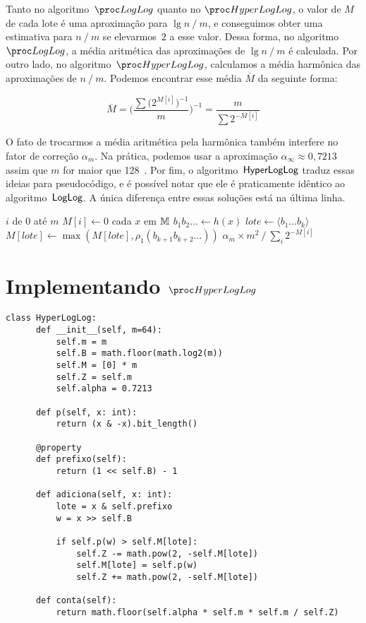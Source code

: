 Tanto no algoritmo~$\LOG$ quanto no $\HLOG$, o valor de $M$ de cada lote é uma aproximação para $\lg n \mathbin{/} m$, e 
conseguimos obter uma estimativa para $n \mathbin{/} m$ se elevarmos~$2$ a esse valor. Dessa forma, no algoritmo~$\LOG$, 
a média aritmética das aproximações de $\lg n \mathbin{/} m$ é calculada. Por outro lado, no algoritmo~$\HLOG$, 
calculamos a média harmônica das aproximações de $n \mathbin{/} m$. Podemos encontrar esse média $\overline{M}$ da 
seguinte forma:

\[ \overline{M} = \bigg(\frac{\sum\big(2^{M[i]}\big)^{-1}}{m}\bigg)^{-1} = \frac{m}{\sum2^{-M[i]}} \]

O fato de trocarmos a média aritmética pela harmônica também interfere no fator de correção $\alpha_m$. Na prática, 
podemos usar a aproximação $\alpha_{\infty} \approx 0{,}7213$ assim que $m$ for maior que 128~\citep{HyperLogLogWiki}.
Por fim, o algoritmo~$\textsf{HyperLogLog}$ traduz essas ideias para pseudocódigo, e é possível notar que ele é praticamente 
idêntico ao algoritmo~$\textsf{LogLog}$. A única diferença entre essas soluções está na última linha.

\begin{codebox}
      \li \For $i$ de $0$ até $m$
            \Do
      \li   $M[i] \gets 0$
            \End
      \li \For cada $x$ em $\mathbb{M}$ 
            \Do
      \li   $b_1b_2{\dots} \gets h(x)$
      \li   $lote \gets \langle b_1 {\dots} b_k \rangle$
      \li   $M[lote] \gets \max(M[lote], \rho_1(b_{k+1}b_{k+2}{\dots}))$
            \End
      \li
      \Return $\alpha_m \times m^2 \mathbin{/} \sum_i{2^{-M[i]}}$   
      \End
\end{codebox}

\newpage
\section{Implementando $\HLOG$}

\begin{lstlisting}[style=mypython,caption=Implementação do algoritmo $\hlogprogram$,captionpos=b, label=hloglog:code]
class HyperLogLog:
      def __init__(self, m=64):
          self.m = m
          self.B = math.floor(math.log2(m))
          self.M = [0] * m
          self.Z = self.m
          self.alpha = 0.7213
  
      def p(self, x: int):
          return (x & -x).bit_length()
  
      @property
      def prefixo(self):
          return (1 << self.B) - 1
  
      def adiciona(self, x: int):
          lote = x & self.prefixo
          w = x >> self.B
  
          if self.p(w) > self.M[lote]:
              self.Z -= math.pow(2, -self.M[lote])
              self.M[lote] = self.p(w)
              self.Z += math.pow(2, -self.M[lote])
  
      def conta(self):
          return math.floor(self.alpha * self.m * self.m / self.Z)
\end{lstlisting}

